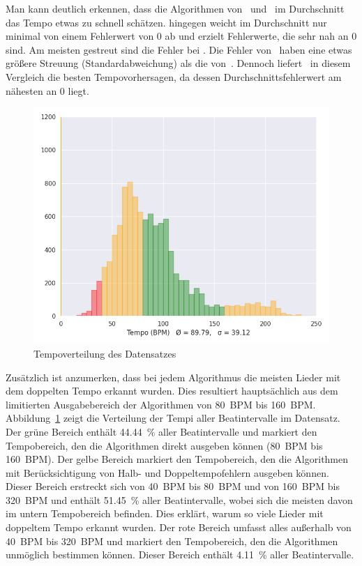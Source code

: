 {{		%
		Man kann deutlich erkennen,
			dass die Algorithmen von~\cite{2001_BeatThis} und~\cite{2011_PlRoSt} im Durchschnitt das Tempo etwas zu schnell schätzen.
		\cite{2009_DaPlSt} hingegen weicht im Durchschnitt nur minimal von einem Fehlerwert von 0 ab
			und erzielt Fehlerwerte,
			die sehr nah an 0 sind.
		Am meisten gestreut sind die Fehler bei \cite{2001_BeatThis}.
		Die Fehler von~\cite{2009_DaPlSt} haben eine etwas grö{\ss}ere Streuung (Standardabweichung) als die von~\cite{2011_PlRoSt}.
		Dennoch liefert~\cite{2009_DaPlSt} in diesem Vergleich die besten Tempovorhersagen,
			da dessen Durchschnittsfehlerwert am nähesten an \num{0} liegt.

		\begin{figure}[h]
			\centering
			\includegraphics[scale=0.45]{resources/dataset_tempo_histogram.png}
			\caption{Tempoverteilung des Datensatzes}
			\label{fig:dataset_tempo}
		\end{figure}

		Zusätzlich ist anzumerken,
			dass bei jedem Algorithmus die meisten Lieder mit dem doppelten Tempo erkannt wurden.
		Dies resultiert hauptsächlich aus dem limitierten Ausgabebereich der Algorithmen von \SI{80}{\ac{BPM}} bis \SI{160}{\ac{BPM}}.
		Abbildung~\ref{fig:dataset_tempo} zeigt die Verteilung der Tempi aller Beatintervalle im Datensatz.
		Der grüne Bereich enthält \SI{44.44}{\percent} aller Beatintervalle
			und markiert den Tempobereich,
			den die Algorithmen direkt ausgeben können (\SI{80}{\ac{BPM}} bis \SI{160}{\ac{BPM}}).
		Der gelbe Bereich markiert den Tempobereich,
			den die Algorithmen mit Berücksichtigung von Halb- und Doppeltempofehlern ausgeben können.
		Dieser Bereich erstreckt sich von \SI{40}{\ac{BPM}} bis \SI{80}{\ac{BPM}} und von \SI{160}{\ac{BPM}} bis \SI{320}{\ac{BPM}}
			und enthält \SI{51.45}{\percent} aller Beatintervalle,
			wobei sich die meisten davon im untern Tempobereich befinden.
		Dies erklärt,
			warum so viele Lieder mit doppeltem Tempo erkannt wurden.
		Der rote Bereich umfasst alles au{\ss}erhalb von \SI{40}{\ac{BPM}} bis \SI{320}{\ac{BPM}}
			und markiert den Tempobereich,
			den die Algorithmen unmöglich bestimmen können.
		Dieser Bereich enthält \SI{4.11}{\percent} aller Beatintervalle.
	}

}
